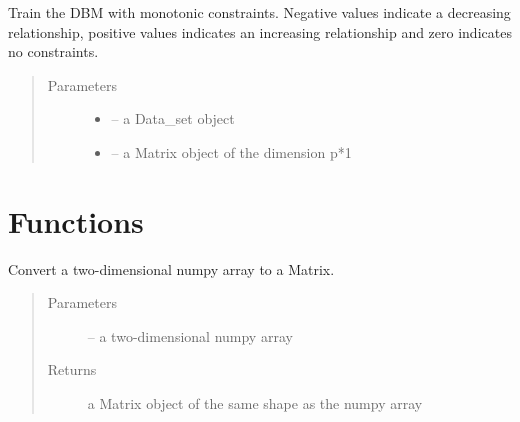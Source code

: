\documentclass[letterpaper,10pt,english]{sphinxmanual}
\begin{document}
\begin{fulllineitems}

\begin{fulllineitems}
\label{\detokenize{index:dbm_py.interface.AUTO_DBM.train_with_monotonic_constraints}}
Train the DBM with monotonic constraints. Negative values
indicate a decreasing relationship, positive values indicates
an increasing relationship and zero indicates no constraints.
\begin{quote}\begin{description}
\item[{Parameters}] \leavevmode\begin{itemize}
\item {} 
 -- a Data\_set object

\item {} 
 -- a Matrix object of the dimension p*1

\end{itemize}

\end{description}\end{quote}

\end{fulllineitems}


\end{fulllineitems}



\chapter{Functions}
\label{\detokenize{index:functions}}

\begin{fulllineitems}
\label{\detokenize{index:dbm_py.interface.np2darray_to_float_matrix}}
Convert a two-dimensional numpy array to a Matrix.
\begin{quote}\begin{description}
\item[{Parameters}] \leavevmode
{} -- a two-dimensional numpy array

\item[{Returns}] \leavevmode
a Matrix object of the same shape as the numpy array

\end{description}\end{quote}

\end{fulllineitems}
\end{document}
